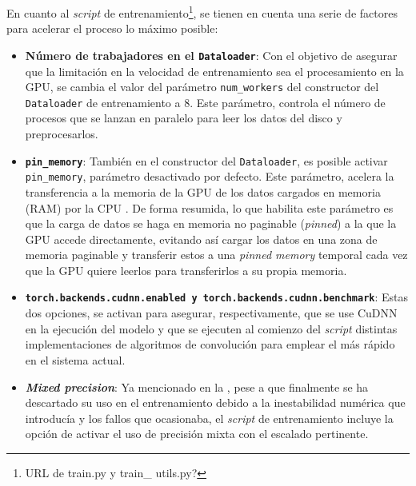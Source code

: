 En cuanto al \textit{script} de entrenamiento\footnote{URL de train.py y train\_ utils.py?}, se tienen en cuenta una serie de factores para acelerar el proceso lo máximo posible:
\begin{itemize}

\item \textbf{Número de trabajadores en el \texttt{Dataloader}}: Con el objetivo de asegurar que la limitación en la velocidad de entrenamiento sea el procesamiento en la GPU, se cambia el valor del parámetro \texttt{num\_workers} del constructor del \texttt{Dataloader} de entrenamiento a 8. Este parámetro, controla el número de procesos que se lanzan en paralelo para leer los datos del disco y preprocesarlos.

\item \textbf{\texttt{pin\_memory}}: También en el constructor del \texttt{Dataloader}, es posible activar \texttt{pin\_memory}, parámetro desactivado por defecto. Este parámetro, acelera la transferencia a la memoria de la GPU de los datos cargados en memoria (RAM) por la CPU \cite{harris2012}. De forma resumida, lo que habilita este parámetro es que la carga de datos se haga en memoria no paginable (\textit{pinned}) a la que la GPU accede directamente, evitando así cargar los datos en una zona de memoria paginable y transferir estos a una \textit{pinned memory} temporal cada vez que la GPU quiere leerlos para transferirlos a su propia memoria.

\item \textbf{\texttt{torch.backends.cudnn.enabled y \texttt{torch.backends.cudnn.benchmark}}}: Estas dos opciones, se activan para asegurar, respectivamente, que se use CuDNN en la ejecución del modelo y que se ejecuten al comienzo del \textit{script} distintas implementaciones de algoritmos de convolución para emplear el más rápido en el sistema actual.

\item \textbf{\textit{Mixed precision}}: Ya mencionado en la , pese a que finalmente se ha descartado su uso en el entrenamiento debido a la inestabilidad numérica que introducía y los fallos que ocasionaba, el \textit{script} de entrenamiento incluye la opción de activar el uso de precisión mixta con el escalado pertinente.
\end{itemize}

